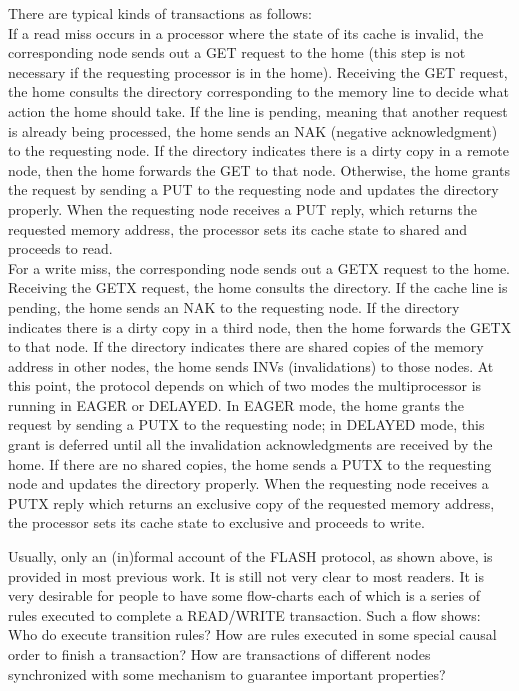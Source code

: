 \documentclass{llncs-new}
\newcommand{\bedt}[1]{{\color{black}#1}}
\begin{document}
 There are typical kinds of transactions as follows:\\%
 If a read miss occurs in a processor where the state of its cache is invalid, the corresponding node sends out a GET request to the
home (this step is not necessary if the requesting processor is in the home). Receiving the
GET request, the home consults the directory corresponding to the memory line to decide
what action the home should take. If the line is pending, meaning that another request
is already being processed, the home sends an NAK (negative acknowledgment) to the
requesting node. If the directory indicates there is a dirty copy in a remote node, then the
home forwards the GET to that node. Otherwise, the home grants the request by sending
a PUT to the requesting node and updates the directory properly. When the requesting
node receives a PUT reply, which returns the requested memory \bedt{address}, the processor sets
its cache state to shared and proceeds to read.\\%
 For a write miss, the corresponding node sends out a GETX request to the home.
Receiving the GETX request, the home consults the directory. If the \bedt{cache} line is pending,
the home sends an NAK to the requesting node. If the directory indicates there is a dirty
copy in a third node, then the home forwards the GETX to that node. If the directory
indicates there are shared copies of the memory \bedt{address} in other nodes, the home sends
INVs (invalidations) to those nodes. At this point, the protocol depends on which of two
modes the multiprocessor is running in EAGER or DELAYED. In EAGER mode, the home
grants the request by sending a PUTX to the requesting node; in DELAYED mode, this
grant is deferred until all the invalidation acknowledgments are received by the home. If
there are no shared copies, the home sends a PUTX to the requesting node and updates
the directory properly. When the requesting node receives a PUTX reply which returns
an exclusive copy of the requested memory \bedt{address}, the processor sets its cache state to
exclusive and proceeds to write.


Usually, only an \bedt{(in)formal}  account of the FLASH protocol, as shown above, is provided in most previous work.   It is still not very clear to most readers. %
It is very desirable for people to have some flow-charts each of  which is a series of rules executed to complete a READ/WRITE transaction. Such a flow shows: Who do execute transition rules? How  are rules executed in some special causal order to finish a transaction? How are transactions of different nodes  synchronized with some mechanism to guarantee  important properties? %
\end{document}
